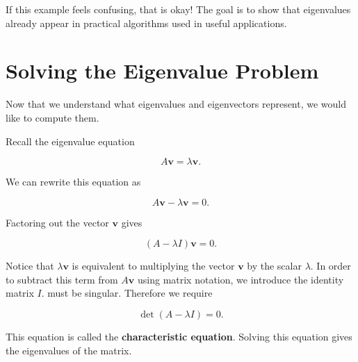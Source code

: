 \documentclass{article}
\begin{document}
If this example feels confusing, that is okay! The goal is to show that eigenvalues already appear in practical algorithms used in useful applications.

\section{Solving the Eigenvalue Problem}

Now that we understand what eigenvalues and eigenvectors represent,
we would like to compute them.

Recall the eigenvalue equation

\[
A\mathbf{v} = \lambda \mathbf{v}.
\]

We can rewrite this equation as

\[
A\mathbf{v} - \lambda \mathbf{v} = 0.
\]

Factoring out the vector $\mathbf{v}$ gives

\[
(A - \lambda I)\mathbf{v} = 0.
\]

Notice that $\lambda \mathbf{v}$ is equivalent to multiplying the vector
$\mathbf{v}$ by the scalar $\lambda$. In order to subtract this term from
$A\mathbf{v}$ using matrix notation, we introduce the identity matrix $I$. 
must be singular. Therefore we require

\[
\det(A - \lambda I) = 0.
\]

This equation is called the \textbf{characteristic equation}.
Solving this equation gives the eigenvalues of the matrix.
\end{document}
